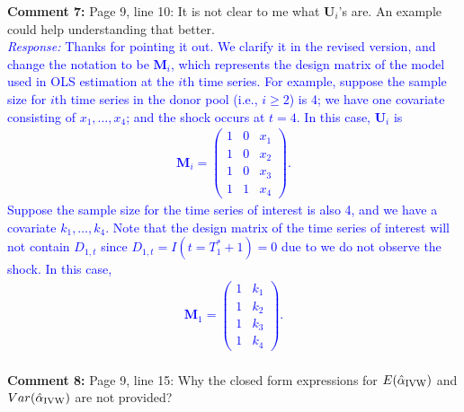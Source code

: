 \documentclass[12pt]{article}
\newcommand{\response}[1]{\noindent \textcolor{blue}{\emph{Response:} #1}}
\begin{document}
{\bf Comment 7:} Page 9, line 10: It is not clear to me what $\mathbf{U}_i$'s are. An example could help understanding that better. \\


\response{Thanks for pointing it out. We  clarify it in the revised version, and change the notation to be $\mathbf{M}_i$, which represents the design matrix of the model used in OLS estimation at the $i$th time series. For example, suppose the sample size for $i$th time series in the donor pool (i.e., $i\geq 2$) is 4; we have one covariate consisting of $x_1, \ldots, x_4$; and the shock occurs at $t = 4$. In this case, $\mathbf{U}_i$ is 
\begin{align*}
  \mathbf{M}_i = \begin{pmatrix}
    1 & 0 & x_1 \\
    1 & 0 & x_2 \\
    1 & 0 & x_3 \\
    1 & 1 & x_4
  \end{pmatrix}.
\end{align*}
Suppose the sample size for the time series of interest is also 4, and we have a covariate $k_1, \ldots, k_4$. Note that the design matrix of the time series of interest will not contain $D_{1,t}$ since $D_{1,t}= I(t=T_1^*+1)=0$ due to we do not observe the shock. In this case, 
\begin{align*}
  \mathbf{M}_1 = \begin{pmatrix}
    1 &  k_1 \\
    1 &  k_2 \\
    1 &  k_3 \\
    1 &  k_4
  \end{pmatrix}.
\end{align*}} \\

{\bf Comment 8:} Page 9, line 15: Why the closed form expressions for $E(\hat{\alpha}_{\rm IVW})$ and $Var(\hat{\alpha}_{\rm IVW})$ are not provided? \\
\end{document}
